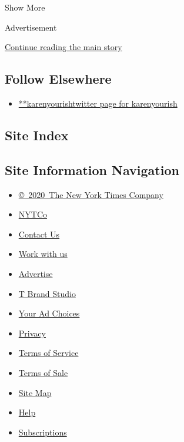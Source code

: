 Show More

Advertisement

\protect\hyperlink{after-mid2}{Continue reading the main story}

\hypertarget{follow-elsewhere}{%
\subsection{Follow Elsewhere}\label{follow-elsewhere}}

\begin{itemize}
\tightlist
\item
  \href{https://twitter.com/karenyourish}{**karenyourishtwitter page for
  karenyourish}
\end{itemize}

\hypertarget{site-index}{%
\subsection{Site Index}\label{site-index}}

\hypertarget{site-information-navigation}{%
\subsection{Site Information
Navigation}\label{site-information-navigation}}

\begin{itemize}
\tightlist
\item
  \href{https://help.nytimes.com/hc/en-us/articles/115014792127-Copyright-notice}{©~2020~The
  New York Times Company}
\end{itemize}

\begin{itemize}
\tightlist
\item
  \href{https://www.nytco.com/}{NYTCo}
\item
  \href{https://help.nytimes.com/hc/en-us/articles/115015385887-Contact-Us}{Contact
  Us}
\item
  \href{https://www.nytco.com/careers/}{Work with us}
\item
  \href{https://nytmediakit.com/}{Advertise}
\item
  \href{http://www.tbrandstudio.com/}{T Brand Studio}
\item
  \href{https://www.nytimes.com/privacy/cookie-policy\#how-do-i-manage-trackers}{Your
  Ad Choices}
\item
  \href{https://www.nytimes.com/privacy}{Privacy}
\item
  \href{https://help.nytimes.com/hc/en-us/articles/115014893428-Terms-of-service}{Terms
  of Service}
\item
  \href{https://help.nytimes.com/hc/en-us/articles/115014893968-Terms-of-sale}{Terms
  of Sale}
\item
  \href{https://spiderbites.nytimes.com}{Site Map}
\item
  \href{https://help.nytimes.com/hc/en-us}{Help}
\item
  \href{https://www.nytimes.com/subscription?campaignId=37WXW}{Subscriptions}
\end{itemize}
